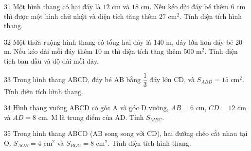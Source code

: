 \begin{probbox}{31}{}
Một hình thang có hai đáy là $12$ cm và $18$ cm. Nếu kéo dài đáy bé thêm $6$ cm thì được một hình chữ nhật và diện tích tăng thêm $27$ cm$^2$. Tính diện tích hình thang.
\end{probbox}
\gap
\begin{probbox}{32}{}
Một thửa ruộng hình thang có tổng hai đáy là $140$ m, đáy lớn hơn đáy bé $20$ m. Nếu kéo dài mỗi đáy thêm $10$ m thì diện tích tăng thêm $500$ m$^2$. Tính diện tích ban đầu và độ dài mỗi đáy.
\end{probbox}
\gap
\begin{probbox}{33}{}
Trong hình thang ABCD, đáy bé AB bằng $\dfrac13$ đáy lớn CD, và $S_{ABD}=15$ cm$^2$. Tính diện tích hình thang.
\end{probbox}
\gap
\begin{probbox}{34}{}
Hình thang vuông ABCD có góc A và góc D vuông, $AB=6$ cm, $CD=12$ cm và $AD=8$ cm. M là trung điểm của AD. Tính $S_{MBC}$.
\end{probbox}
\gap
\begin{probbox}{35}{}
Trong hình thang ABCD (AB song song với CD), hai đường chéo cắt nhau tại O. $S_{AOB}=4$ cm$^2$ và $S_{BOC}=8$ cm$^2$. Tính diện tích hình thang.
\end{probbox}
